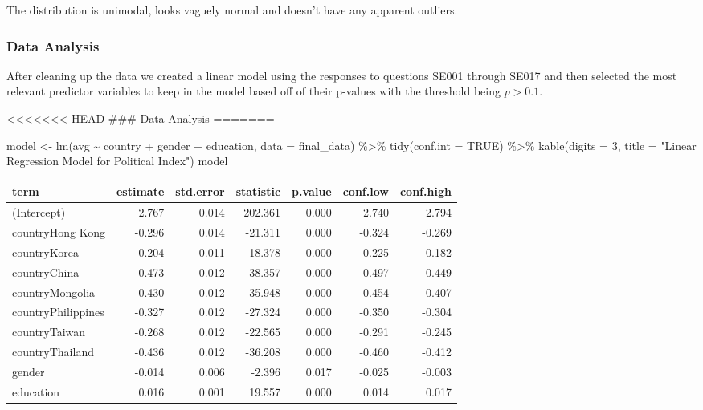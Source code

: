 \documentclass[
]{article}
\newenvironment{Shaded}{\begin{snugshade}}{\end{snugshade}}
\newcommand{\AttributeTok}[1]{\textcolor[rgb]{0.77,0.63,0.00}{#1}}
\newcommand{\ConstantTok}[1]{\textcolor[rgb]{0.00,0.00,0.00}{#1}}
\newcommand{\DecValTok}[1]{\textcolor[rgb]{0.00,0.00,0.81}{#1}}
\newcommand{\FunctionTok}[1]{\textcolor[rgb]{0.00,0.00,0.00}{#1}}
\newcommand{\NormalTok}[1]{#1}
\newcommand{\OtherTok}[1]{\textcolor[rgb]{0.56,0.35,0.01}{#1}}
\newcommand{\SpecialCharTok}[1]{\textcolor[rgb]{0.00,0.00,0.00}{#1}}
\newcommand{\StringTok}[1]{\textcolor[rgb]{0.31,0.60,0.02}{#1}}
\begin{document}
The distribution is unimodal, looks vaguely normal and doesn't have any
apparent outliers.

\hypertarget{data-analysis}{%
\subsubsection{Data Analysis}\label{data-analysis}}

After cleaning up the data we created a linear model using the responses
to questions SE001 through SE017 and then selected the most relevant
predictor variables to keep in the model based off of their p-values
with the threshold being \(p > 0.1\).

\textless\textless\textless\textless\textless\textless\textless{} HEAD
\#\#\# Data Analysis =======

\begin{Shaded}
\begin{Highlighting}[]
\NormalTok{model }\OtherTok{\textless{}{-}} \FunctionTok{lm}\NormalTok{(avg }\SpecialCharTok{\textasciitilde{}}\NormalTok{ country }\SpecialCharTok{+}\NormalTok{ gender }\SpecialCharTok{+}\NormalTok{ education, }\AttributeTok{data =}\NormalTok{ final\_data) }\SpecialCharTok{\%\textgreater{}\%}
  \FunctionTok{tidy}\NormalTok{(}\AttributeTok{conf.int =} \ConstantTok{TRUE}\NormalTok{) }\SpecialCharTok{\%\textgreater{}\%}
  \FunctionTok{kable}\NormalTok{(}\AttributeTok{digits =} \DecValTok{3}\NormalTok{, }\AttributeTok{title =} \StringTok{"Linear Regression Model for Political Index"}\NormalTok{)}
\NormalTok{model}
\end{Highlighting}
\end{Shaded}

\begin{longtable}[]{@{}lrrrrrr@{}}
\toprule
term & estimate & std.error & statistic & p.value & conf.low &
conf.high \\
\midrule
\endhead
(Intercept) & 2.767 & 0.014 & 202.361 & 0.000 & 2.740 & 2.794 \\
countryHong Kong & -0.296 & 0.014 & -21.311 & 0.000 & -0.324 & -0.269 \\
countryKorea & -0.204 & 0.011 & -18.378 & 0.000 & -0.225 & -0.182 \\
countryChina & -0.473 & 0.012 & -38.357 & 0.000 & -0.497 & -0.449 \\
countryMongolia & -0.430 & 0.012 & -35.948 & 0.000 & -0.454 & -0.407 \\
countryPhilippines & -0.327 & 0.012 & -27.324 & 0.000 & -0.350 &
-0.304 \\
countryTaiwan & -0.268 & 0.012 & -22.565 & 0.000 & -0.291 & -0.245 \\
countryThailand & -0.436 & 0.012 & -36.208 & 0.000 & -0.460 & -0.412 \\
gender & -0.014 & 0.006 & -2.396 & 0.017 & -0.025 & -0.003 \\
education & 0.016 & 0.001 & 19.557 & 0.000 & 0.014 & 0.017 \\
\bottomrule
\end{longtable}
\end{document}
